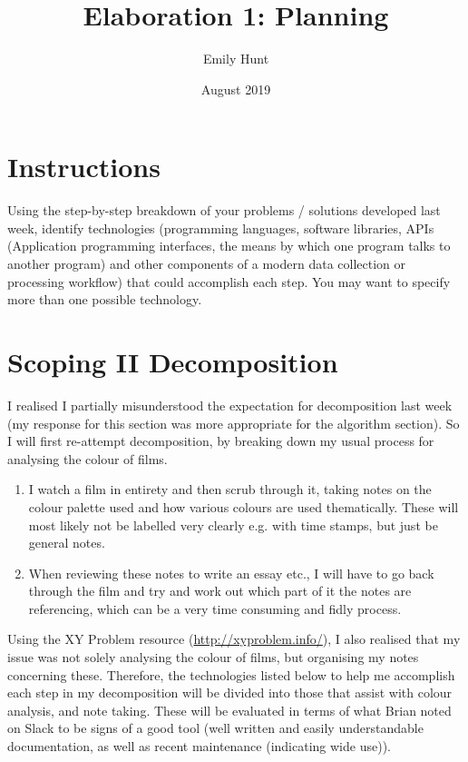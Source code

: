 \documentclass{article}
\title{Elaboration 1: Planning}
\author{Emily Hunt}
\date{August 2019}
\begin{document}
\maketitle

\section*{Instructions}
Using the step-by-step breakdown of your problems / solutions developed last week, identify technologies (programming languages, software libraries, APIs (Application programming interfaces, the means by which one program talks to another program) and other components of a modern data collection or processing workflow) that could accomplish each step. You may want to specify more than one possible technology. 

\section*{Scoping II Decomposition}
I realised I partially misunderstood the expectation for decomposition last week (my response for this section was more appropriate for the algorithm section). So I will first re-attempt decomposition, by breaking down my usual process for analysing the colour of films.

\begin{enumerate}
    \item I watch a film in entirety and then scrub through it, taking notes on the colour palette used and how various colours are used thematically. These will most likely not be labelled very clearly e.g. with time stamps, but just be general notes.
    \item When reviewing these notes to write an essay etc., I will have to go back through the film and try and work out which part of it the notes are referencing, which can be a very time consuming and fidly process.
\end{enumerate} 

Using the XY Problem resource (\url{http://xyproblem.info/}), I also realised that my issue was not solely analysing the colour of films, but organising my notes concerning these. Therefore, the technologies listed below to help me accomplish each step in my decomposition will be divided into those that assist with colour analysis, and note taking. These will be evaluated in terms of what Brian noted on Slack to be signs of a good tool (well written and easily understandable documentation, as well as recent maintenance (indicating wide use)).
\end{document}
